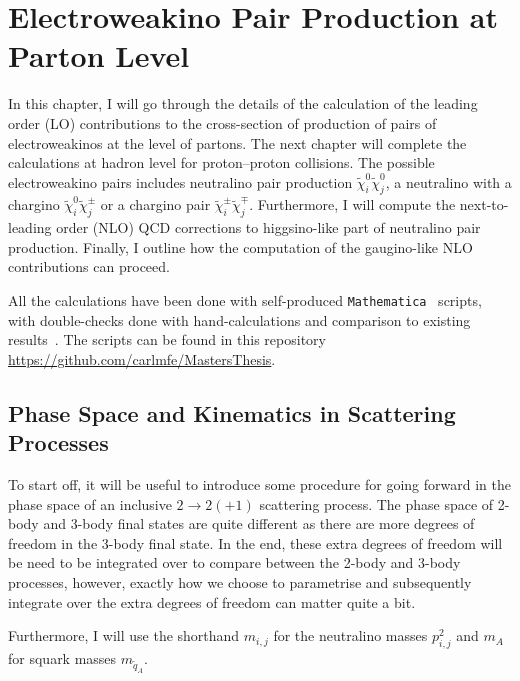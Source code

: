 \documentclass[../main.tex]{subfiles}
\begin{document}
\chapter{Electroweakino Pair Production at Parton Level}
\label{chap:part:parton_calculation}
In this chapter, I will go through the details of the calculation of the leading order (LO) contributions to the cross-section of production of pairs of electroweakinos at the level of partons.
The next chapter will complete the calculations at hadron level for proton--proton collisions.
The possible electroweakino pairs includes neutralino pair production \(\tilde\chi^0_i \tilde\chi^0_j\), a neutralino with a chargino \(\tilde\chi^0_i \tilde\chi^\pm_j\) or a chargino pair \(\tilde\chi^\pm_i \tilde\chi^\mp_j\).
Furthermore, I will compute the next-to-leading order (NLO) QCD corrections to higgsino-like part of neutralino pair production.
Finally, I outline how the computation of the gaugino-like NLO contributions can proceed.

All the calculations have been done with self-produced \verb|Mathematica|~\cite{Mathematica} scripts, with double-checks done with hand-calculations and comparison to existing results~\cite{Debove:2010kf,Demirci:2014gva}.
The scripts can be found in this repository \url{https://github.com/carlmfe/MastersThesis}.


\section{Phase Space and Kinematics in Scattering Processes}
To start off, it will be useful to introduce some procedure for going forward
in the phase space of an inclusive \(2\to 2(+1)\) scattering process.
The phase space of 2-body and 3-body final states are quite different as there are
more degrees of freedom in the 3-body final state.
In the end, these extra degrees of freedom will be need to be integrated over to compare between the 2-body and 3-body processes, however, exactly how we
choose to parametrise and subsequently integrate over the extra degrees of
freedom can matter quite a bit.
\medskip

Furthermore, I will use the shorthand \(m_{i,j}\) for the neutralino masses \(p_{i,j}^2\) and \(m_A\) for squark masses \(m_{\tilde{q}_A}\).
\end{document}
